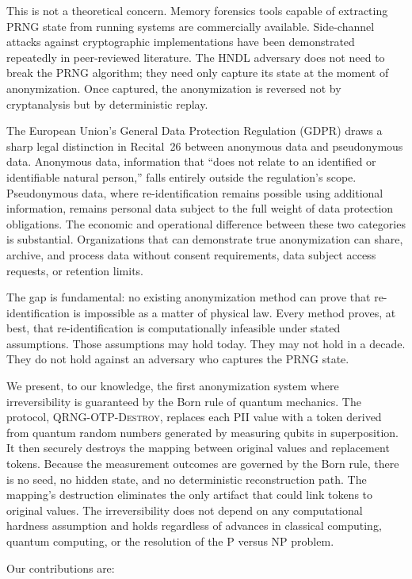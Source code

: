 \documentclass[journal]{IEEEtran}
\begin{document}
This is not a theoretical concern. Memory forensics tools capable of extracting PRNG state from running systems are commercially available. Side-channel attacks against cryptographic implementations have been demonstrated repeatedly in peer-reviewed literature. The HNDL adversary does not need to break the PRNG algorithm; they need only capture its state at the moment of anonymization. Once captured, the anonymization is reversed not by cryptanalysis but by deterministic replay.

The European Union's General Data Protection Regulation (GDPR) draws a sharp legal distinction in Recital~26 between anonymous data and pseudonymous data. Anonymous data, information that ``does not relate to an identified or identifiable natural person,'' falls entirely outside the regulation's scope. Pseudonymous data, where re-identification remains possible using additional information, remains personal data subject to the full weight of data protection obligations. The economic and operational difference between these two categories is substantial. Organizations that can demonstrate true anonymization can share, archive, and process data without consent requirements, data subject access requests, or retention limits.

The gap is fundamental: no existing anonymization method can prove that re-identification is impossible as a matter of physical law. Every method proves, at best, that re-identification is computationally infeasible under stated assumptions. Those assumptions may hold today. They may not hold in a decade. They do not hold against an adversary who captures the PRNG state.

We present, to our knowledge, the first anonymization system where irreversibility is guaranteed by the Born rule of quantum mechanics. The protocol, \textsc{QRNG-OTP-Destroy}, replaces each PII value with a token derived from quantum random numbers generated by measuring qubits in superposition. It then securely destroys the mapping between original values and replacement tokens. Because the measurement outcomes are governed by the Born rule, there is no seed, no hidden state, and no deterministic reconstruction path. The mapping's destruction eliminates the only artifact that could link tokens to original values. The irreversibility does not depend on any computational hardness assumption and holds regardless of advances in classical computing, quantum computing, or the resolution of the P versus NP problem.

Our contributions are:
\end{document}
